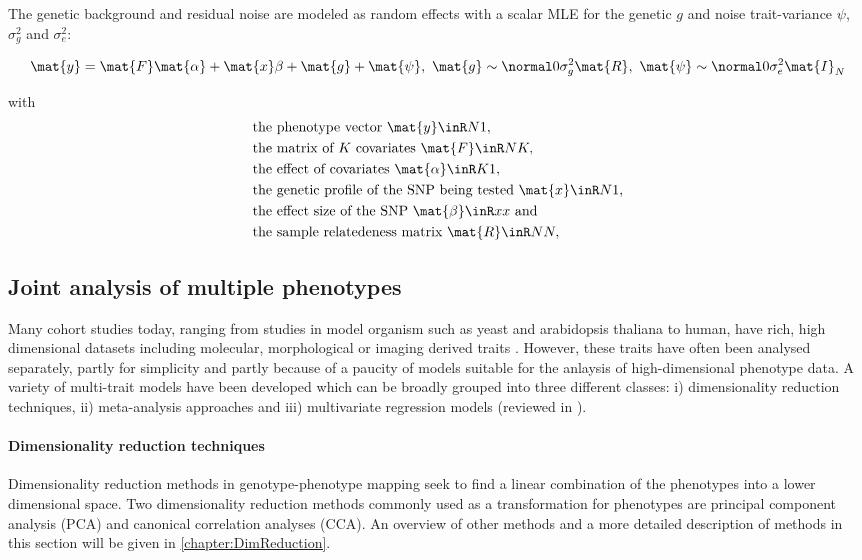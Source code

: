 The genetic background and residual noise are modeled as random effects with a scalar MLE for the genetic \(g\) and noise trait-variance \(\psi\),   \(\sigma_g^2\) and \(\sigma_e^2\):

\begin{equation}
\mat{y} =\mat{F}\mat{\alpha} +\mat{x}\beta +\mat{g}+\mat{\psi},\text{ }
\mat{g} \sim \normal 0 {\sigma_g^2\mat{R}},\text{ }
\mat{\psi} \sim\normal 0 {\sigma_e^2\mat{I}_N}
\label{eq:lmm-uv}
\end{equation}

with
\begin{align*} 
& \text{the phenotype vector }\mat{y} \inR N 1,\\
& \text{the matrix of $K$ covariates }\mat{F} \inR N K,\\
& \text{the effect of covariates } \mat{\alpha} \inR K 1,\\
& \text{the genetic profile of the SNP being tested }\mat{x} \inR N 1,\\
& \text{the effect size of the SNP } \mat{\beta} \inR x x \text{ and}\\
& \text{the sample relatedeness matrix }\mat{R} \inR N N,
\end{align*} 


\subsection{Joint analysis of multiple phenotypes}
Many cohort studies today, ranging from studies in model organism such as yeast and arabidopsis thaliana to human, have rich, high dimensional datasets including molecular, morphological or imaging derived traits \citep{Bloom2013,Atwell2010,Astle2009,Shaffer2016,Stein2010}. However, these traits have often been analysed separately,  partly for simplicity and partly because of a paucity of models suitable for the anlaysis of high-dimensional phenotype data. A variety of multi-trait models have been developed which can be broadly grouped into three different classes: i) dimensionality reduction techniques, ii) meta-analysis approaches and iii) multivariate regression models (reviewed in \citep{Shriner2012,Yang2012}). 

\paragraph{Dimensionality reduction techniques} Dimensionality reduction methods in genotype-phenotype mapping seek to find a linear combination of the phenotypes into a lower dimensional space. Two dimensionality reduction methods commonly used as a transformation for phenotypes are principal component analysis (PCA) and canonical correlation analyses (CCA). An overview of other methods and a more detailed description of methods in this section will be given in \cref{chapter:DimReduction}. 

